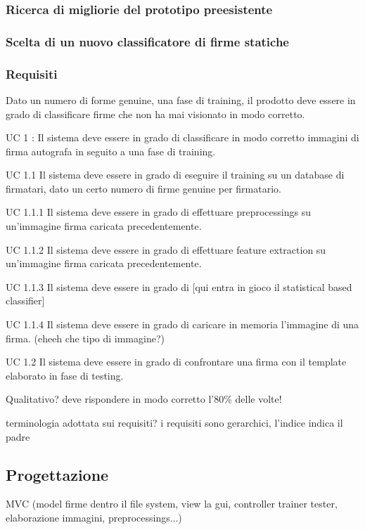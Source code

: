\subsubsection{Ricerca di migliorie del prototipo preesistente}
\label{3.2.1}

\subsubsection{Scelta di un nuovo classificatore di firme statiche}
\label{3.2.2}

\subsubsection{Requisiti}
\label{3.2.3}
Dato un numero di forme genuine, una fase di training, il prodotto deve essere in grado di classificare firme che non ha mai visionato in modo corretto.

UC 1 : Il sistema deve essere in grado di classificare in modo corretto immagini di firma autografa in seguito a una fase di training.

UC 1.1 Il sistema deve essere in grado di eseguire il training su un database di firmatari, dato un certo numero di firme genuine per firmatario.

UC 1.1.1 Il sistema deve essere in grado di effettuare preprocessings su un'immagine firma caricata precedentemente.

UC 1.1.2 Il sistema deve essere in grado di effettuare feature extraction su un'immagine firma caricata precedentemente.

UC 1.1.3 Il sistema deve essere in grado di [qui entra in gioco il statistical based classifier] 

UC 1.1.4 Il sistema deve essere in grado di caricare in memoria l'immagine di una firma. (eheeh che tipo di immagine?)

UC 1.2 Il sistema deve essere in grado di confrontare una firma con il template elaborato in fase di testing.


Qualitativo? deve rispondere in modo corretto l'80\% delle volte!

terminologia adottata sui requisiti?
i requisiti sono gerarchici, l'indice indica il padre 
\subsection{Progettazione}
\label{3.3}
MVC (model firme dentro il file system, view la gui, controller trainer tester, elaborazione immagini, preprocessings...)


